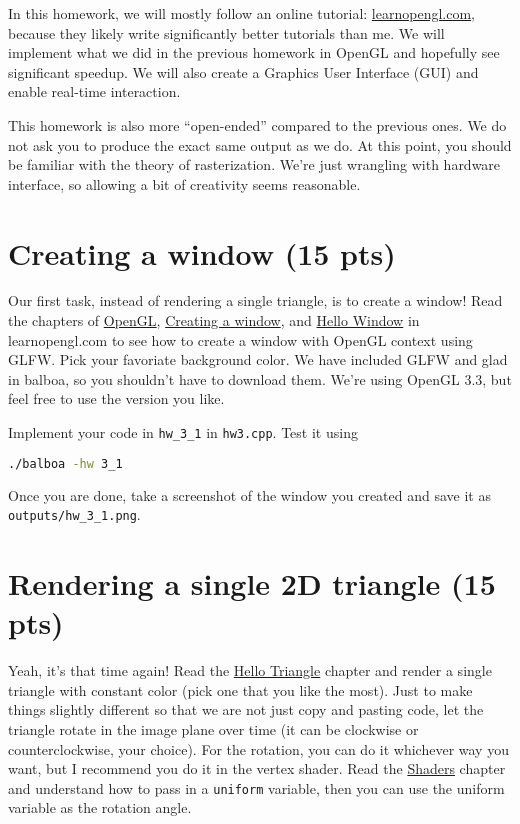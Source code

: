 In this homework, we will mostly follow an online tutorial: \href{https://learnopengl.com/}{learnopengl.com}, because they likely write significantly better tutorials than me. We will implement what we did in the previous homework in OpenGL and hopefully see significant speedup. We will also create a Graphics User Interface (GUI) and enable real-time interaction.

This homework is also more ``open-ended'' compared to the previous ones. We do not ask you to produce the exact same output as we do. At this point, you should be familiar with the theory of rasterization. We're just wrangling with hardware interface, so allowing a bit of creativity seems reasonable.

\section{Creating a window (15 pts)}

Our first task, instead of rendering a single triangle, is to create a window! Read the chapters of \href{https://learnopengl.com/Getting-started/OpenGL}{OpenGL}, \href{https://learnopengl.com/Getting-started/Creating-a-window}{Creating a window}, and \href{https://learnopengl.com/Getting-started/Hello-Window}{Hello Window} in learnopengl.com to see how to create a window with OpenGL context using GLFW. Pick your favoriate background color. We have included GLFW and glad in balboa, so you shouldn't have to download them. We're using OpenGL 3.3, but feel free to use the version you like.

Implement your code in \lstinline{hw_3_1} in \lstinline{hw3.cpp}. Test it using
\begin{lstlisting}[language=bash]
./balboa -hw 3_1
\end{lstlisting}

Once you are done, take a screenshot of the window you created and save it as \lstinline{outputs/hw_3_1.png}.

\section{Rendering a single 2D triangle (15 pts)}

Yeah, it's that time again! Read the \href{https://learnopengl.com/Getting-started/Hello-Triangle}{Hello Triangle} chapter and render a single triangle with constant color (pick one that you like the most). Just to make things slightly different so that we are not just copy and pasting code, let the triangle rotate in the image plane over time (it can be clockwise or counterclockwise, your choice). For the rotation, you can do it whichever way you want, but I recommend you do it in the vertex shader. Read the \href{https://learnopengl.com/Getting-started/Shaders}{Shaders} chapter and understand how to pass in a \lstinline{uniform} variable, then you can use the uniform variable as the rotation angle.  

